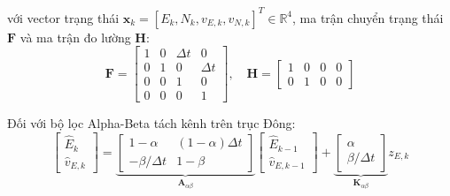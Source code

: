 với vector trạng thái $\mathbf{x}_k = [E_k, N_k, v_{E,k}, v_{N,k}]^T \in \mathbb{R}^4$, ma trận chuyển trạng thái $\mathbf{F}$ và ma trận đo lường $\mathbf{H}$:
\begin{equation}
\mathbf{F} = \begin{bmatrix}
1 & 0 & \Delta t & 0 \\
0 & 1 & 0 & \Delta t \\
0 & 0 & 1 & 0 \\
0 & 0 & 0 & 1
\end{bmatrix}, \quad
\mathbf{H} = \begin{bmatrix}
1 & 0 & 0 & 0 \\
0 & 1 & 0 & 0
\end{bmatrix}
\label{eq:F-and-H-matrices-w14}
\end{equation}

Đối với bộ lọc Alpha-Beta tách kênh trên trục Đông:
\begin{equation}
\begin{bmatrix} \hat{E}_k \\ \hat{v}_{E,k} \end{bmatrix} = \underbrace{\begin{bmatrix} 1-\alpha & (1-\alpha)\Delta t \\ -\beta/\Delta t & 1-\beta \end{bmatrix}}_{\mathbf{A}_{\alpha\beta}} \begin{bmatrix} \hat{E}_{k-1} \\ \hat{v}_{E,k-1} \end{bmatrix} + \underbrace{\begin{bmatrix} \alpha \\ \beta/\Delta t \end{bmatrix}}_{\mathbf{K}_{\alpha\beta}} z_{E,k}
\label{eq:alphabeta-state-space-matrix}
\end{equation}


